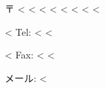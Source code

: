 〒 <%
<%
<%
<%
<%
\vspace{0.3cm}
<%
<%
\vspace{0.2cm}
<%

\vspace{1.0cm}

<%
Tel: <%
<%

<%
Fax: <%
<%

メール: <%